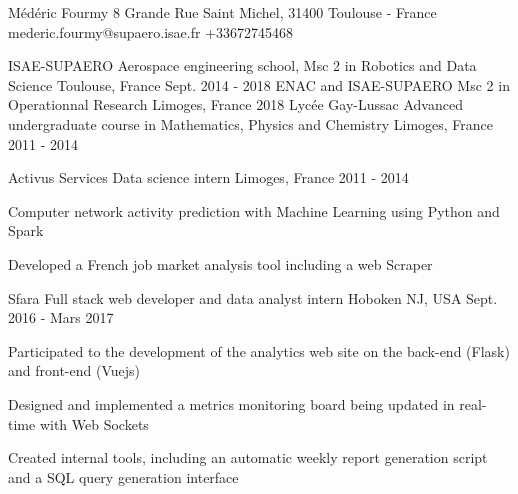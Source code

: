 \documentclass[11pt, a4paper, final]{resume}
\begin{document}
	\header
		{Médéric}
		{Fourmy}
		{8 Grande Rue Saint Michel, 31400 Toulouse - France}
		{mederic.fourmy@supaero.isae.fr}
		{+33672745468}

	\begin{cventries}
		\cventry
		{ISAE-SUPAERO}
		{Aerospace engineering school, Msc 2 in Robotics and Data Science}
		{Toulouse, France}
		{Sept. 2014 - 2018}
		{}
		\cventry
		{ENAC and ISAE-SUPAERO}
		{Msc 2 in Operationnal Research}
		{Limoges, France}
		{2018}
		{}
		\cventry
		{Lycée Gay-Lussac}
		{Advanced undergraduate course in Mathematics, Physics and Chemistry}
		{Limoges, France}
		{2011 - 2014}
		{}
	\end{cventries}

	\cvsection{Work experience}
	\begin{cventries}
		\cventry
		{Activus Services}
		{Data science intern}
		{Limoges, France}
		{2011 - 2014}
		{
			\begin{cvitems}{}
				\item Computer network activity prediction with Machine Learning using Python and Spark
				\item Developed a French job market analysis tool including a web Scraper
			\end{cvitems}
		}
		\cventry
		{Sfara}
		{Full stack web developer and data analyst intern}
		{Hoboken NJ, USA}
		{Sept. 2016 - Mars 2017}
		{
			\begin{cvitems}{}
				\item Participated to the development of the analytics web site on the back-end (Flask) and front-end (Vuejs)
				\item Designed and implemented a metrics monitoring board being updated in real-time with Web Sockets
				\item Created internal tools, including an automatic weekly report generation script and a SQL query generation interface
			\end{cvitems}
		}
	\end{cventries}
\end{document}
